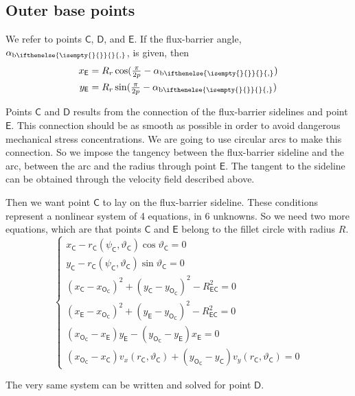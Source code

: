 \documentclass[b5paper,11pt,oneside,fleqn]{article}
\newcommand{\pt}[1]{\mathsf{#1}}
\newcommand{\te}{\vartheta}
\newcommand{\ab}[1][]{%
\alpha_{\textup{b}
\ifthenelse{\isempty{#1}{}}{}{,#1}%
}}
\newcommand{\pih}[1][]{\tfrac{\pi}{2#1}}
\begin{document}
\subsection{Outer base points}
We refer to points $ \pt{C} $, $ \pt{D} $, and $ \pt{E} $.
If the flux-barrier angle, $ \ab $, is given, then
\begin{equation}
\begin{aligned}
x_\pt{E} &= R_r \cos(\pih[p] - \ab) \\
y_\pt{E} &= R_r \sin(\pih[p] - \ab)
\end{aligned}
\end{equation}

Points $ \pt{C} $ and $ \pt{D} $ results from the connection of the
flux-barrier sidelines and point $ \pt{E} $.
This connection should be as smooth as possible in order to
avoid dangerous mechanical stress concentrations.
We are going to use circular arcs to make this connection.
So we impose the tangency between the flux-barrier sideline and the arc,
between the arc and the radius through point $ \pt{E} $.
The tangent to the sideline can be obtained through the velocity field
described above.

Then we want point $ \pt{C} $ to lay on the flux-barrier sideline. These
conditions represent a nonlinear system of 4 equations, in 6 unknowns.
So we need two more equations, which are that points $ \pt{C} $ and $ \pt{E} $
belong to the fillet circle with radius $ R $.
\begin{equation}
\begin{cases}
x_\pt{C} - r_\pt{C}(\psi_\pt{C}, \te_\pt{C}) \cos\te_\pt{C} = 0 \\
y_\pt{C} - r_\pt{C}(\psi_\pt{C}, \te_\pt{C}) \sin\te_\pt{C} = 0 \\
%
(x_\pt{C} - x_\pt{O_\pt{C}})^2 + (y_\pt{C} - y_\pt{O_\pt{C}})^2
- R_\pt{EC}^2 = 0 \\
(x_\pt{E} - x_\pt{O_\pt{C}})^2 + (y_\pt{E} - y_\pt{O_\pt{C}})^2
- R_\pt{EC}^2 = 0 \\
%
(x_\pt{O_\pt{C}} - x_\pt{E}) y_\pt{E} -
(y_\pt{O_\pt{C}} - y_\pt{E}) x_\pt{E} = 0 \\
%
(x_\pt{O_\pt{C}} - x_\pt{C}) v_x(r_\pt{C},\te_\pt{C}) +
(y_\pt{O_\pt{C}} - y_\pt{C}) v_y(r_\pt{C},\te_\pt{C}) = 0
\end{cases}
\end{equation}

The very same system can be written and solved for point $ \pt{D} $.
\end{document}
